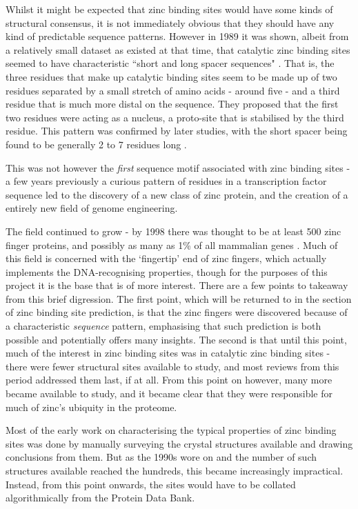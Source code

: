 Whilst it might be expected that zinc binding sites would have some kinds of structural consensus, it is not immediately obvious that they should have any kind of predictable sequence patterns. However in 1989 it was shown, albeit from a relatively small dataset as existed at that time, that catalytic zinc binding sites seemed to have characteristic ``short and long spacer sequences" \cite{vallee1989short}. That is, the three residues that make up catalytic binding sites seem to be made up of two residues separated by a small stretch of amino acids - around five - and a third residue that is much more distal on the sequence. They proposed that the first two residues were acting as a nucleus, a proto-site that is stabilised by the third residue. This pattern was confirmed by later studies, with the short spacer being found to be generally 2 to 7 residues long \cite{patel2007analysis}.

This was not however the \textit{first} sequence motif associated with zinc binding sites - a few years previously a curious pattern of residues in a transcription factor sequence led to the discovery of a new class of zinc protein, and the creation of a entirely new field of genome engineering.


The field continued to grow - by 1998 there was thought to be at least 500 zinc finger proteins, and possibly as many as 1\% of all mammalian genes \cite{mackay1998zinc}. Much of this field is concerned with the `fingertip' end of zinc fingers, which actually implements the DNA-recognising properties, though for the purposes of this project it is the base that is of more interest. There are a few points to takeaway from this brief digression. The first point, which will be returned to in the section of zinc binding site prediction, is that the zinc fingers were discovered because of a characteristic \textit{sequence} pattern, emphasising that such prediction is both possible and potentially offers many insights. The second is that until this point, much of the interest in zinc binding sites was in catalytic zinc binding sites - there were fewer structural sites available to study, and most reviews from this period addressed them last, if at all. From this point on however, many more became available to study, and it became clear that they were responsible for much of zinc's ubiquity in the proteome.

Most of the early work on characterising the typical properties of zinc binding sites was done by manually surveying the crystal structures available and drawing conclusions from them. But as the 1990s wore on and the number of such structures available reached the hundreds, this became increasingly impractical. Instead, from this point onwards, the sites would have to be collated algorithmically from the Protein Data Bank.

